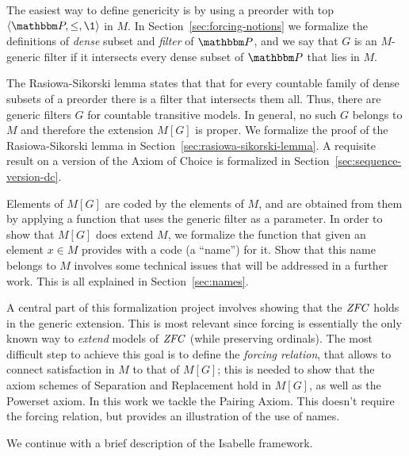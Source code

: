The easiest way to define genericity is by using a preorder with top
$\lb\PP,\leq,\1\rb$ in $M$.   
In Section~\ref{sec:forcing-notions} we formalize the definitions of
\emph{dense} subset and  \emph{filter} of  $\PP$, and we say that  $G$
is an $M$-generic filter
if it intersects every dense subset of $\PP$ that lies in $M$.

The  Rasiowa-Sikorski lemma  states that that for every countable 
family of dense subsets of a preorder there is a filter that intersects them
all. Thus, there are generic filters $G$ for countable transitive models.  In
general, no such  $G$ belongs to $M$ and therefore the extension
$M[G]$ is proper. We formalize the proof of the Rasiowa-Sikorski lemma
in Section~\ref{sec:rasiowa-sikorski-lemma}. A requisite result on
a version of the Axiom of Choice is formalized in
Section~\ref{sec:sequence-version-dc}.

Elements of $M[G]$ are coded by the elements of $M$, and are obtained
from them by applying a function  that uses the generic filter
as a parameter. In order to show
that $M[G]$ does  extend $M$, we formalize the function 
that given an element $x\in M$ provides with a code (a ``name'') for
it. Show that this name belongs to $M$ involves some technical issues
that will be addressed in a further work. This is all explained in
Section~\ref{sec:names}.
 

A central part of this formalization project involves showing that the
$\mathit{ZFC}$ holds in the generic extension. This is most relevant since
forcing is essentially the only known way to \emph{extend} models of
$\mathit{ZFC}$ (while preserving ordinals). The most difficult step to achieve
this goal is to define the \emph{forcing relation}, that allows to
connect satisfaction in $M$ to that of $M[G]$; this is needed to show
that the axiom schemes of Separation and Replacement hold in $M[G]$,
as well as the Powerset axiom. In this work we tackle the Pairing
Axiom. This doesn't require the 
forcing relation, but provides an illustration of the use of names.  
   
We continue with a brief description of the Isabelle framework. 
